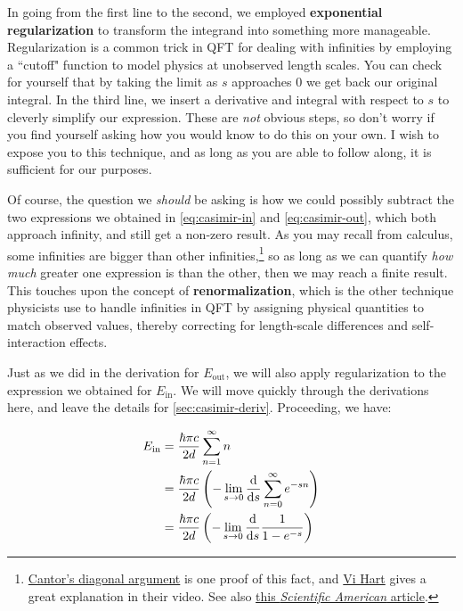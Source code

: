 In going from the first line to the second, we employed \textbf{exponential regularization} to transform the integrand into something more manageable. 
Regularization is a common trick in QFT for dealing with infinities by employing a ``cutoff" function to model physics at unobserved length scales. 
You can check for yourself that by taking the limit as $s$ approaches 0 we get back our original integral. 
In the third line, we insert a derivative and integral with respect to $s$ to cleverly simplify our expression. 
These are \emph{not} obvious steps, so don't worry if you find yourself asking how you would know to do this on your own. 
I wish to expose you to this technique, and as long as you are able to follow along, it is sufficient for our purposes. 

Of course, the question we \emph{should} be asking is how we could possibly subtract the two expressions we obtained in \autoref{eq:casimir-in} and \ref{eq:casimir-out}, which both approach infinity, and still get a non-zero result. 
As you may recall from calculus, some infinities are bigger than other infinities,\footnote{\href{https://en.wikipedia.org/wiki/Cantor\%27s_diagonal_argument}{Cantor's diagonal argument} is one proof of this fact, and \href{https://www.khanacademy.org/math/math-for-fun-and-glory/vi-hart/infinity/v/proof-infinities}{Vi Hart} gives a great explanation in their video.
See also \href{https://www.scientificamerican.com/article/a-deep-math-dive-into-why-some-infinities-are-bigger-than-others/}{this \emph{Scientific American} article}.} so as long as we can quantify \emph{how much} greater one expression is than the other, then we may reach a finite result. 
This touches upon the concept of \textbf{renormalization}, which is the other technique physicists use to handle infinities in QFT by assigning physical quantities to match observed values, thereby correcting for length-scale differences and self-interaction effects. 

Just as we did in the derivation for $E_{\text{out}}$, we will also apply regularization to the expression we obtained for $E_{\text{in}}$. 
We will move quickly through the derivations here, and leave the details for \autoref{sec:casimir-deriv}. 
Proceeding, we have:

\begin{align*}
	E_{\text{in}} &= \frac{\hbar \pi c}{2d} \sum_{n=1}^{\infty} n \\
	&= \frac{\hbar \pi c}{2d} \left( - \lim\limits_{s \rightarrow 0} \dv{s} \sum_{n=0}^{\infty} e^{-sn} \right) \\
	&= \frac{\hbar \pi c}{2d} \left( - \lim\limits_{s \rightarrow 0} \dv{s} \frac{1}{1-e^{-s}} \right)
\end{align*}

